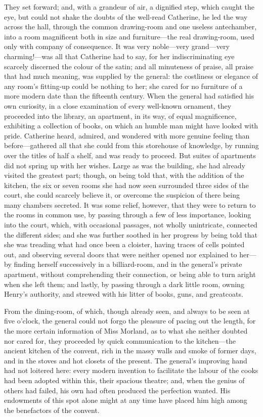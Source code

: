 They set forward; and, with a grandeur of air, a dignified step, which caught the eye, but could not shake the doubts of the well-read Catherine, he led the way across the hall, through the common drawing-room and one useless antechamber, into a room magnificent both in size and furniture---the real drawing-room, used only with company of consequence. It was very noble---very grand---very charming!---was all that Catherine had to say, for her indiscriminating eye scarcely discerned the colour of the satin; and all minuteness of praise, all praise that had much meaning, was supplied by the general: the costliness or elegance of any room's fitting-up could be nothing to her; she cared for no furniture of a more modern date than the fifteenth century. When the general had satisfied his own curiosity, in a close examination of every well-known ornament, they proceeded into the library, an apartment, in its way, of equal magnificence, exhibiting a collection of books, on which an humble man might have looked with pride. Catherine heard, admired, and wondered with more genuine feeling than before---gathered all that she could from this storehouse of knowledge, by running over the titles of half a shelf, and was ready to proceed. But suites of apartments did not spring up with her wishes. Large as was the building, she had already visited the greatest part; though, on being told that, with the addition of the kitchen, the six or seven rooms she had now seen surrounded three sides of the court, she could scarcely believe it, or overcome the suspicion of there being many chambers secreted. It was some relief, however, that they were to return to the rooms in common use, by passing through a few of less importance, looking into the court, which, with occasional passages, not wholly unintricate, connected the different sides; and she was further soothed in her progress by being told that she was treading what had once been a cloister, having traces of cells pointed out, and observing several doors that were neither opened nor explained to her---by finding herself successively in a billiard-room, and in the general's private apartment, without comprehending their connection, or being able to turn aright when she left them; and lastly, by passing through a dark little room, owning Henry's authority, and strewed with his litter of books, guns, and greatcoats.

From the dining-room, of which, though already seen, and always to be seen at five o'clock, the general could not forgo the pleasure of pacing out the length, for the more certain information of Miss Morland, as to what she neither doubted nor cared for, they proceeded by quick communication to the kitchen---the ancient kitchen of the convent, rich in the massy walls and smoke of former days, and in the stoves and hot closets of the present. The general's improving hand had not loitered here: every modern invention to facilitate the labour of the cooks had been adopted within this, their spacious theatre; and, when the genius of others had failed, his own had often produced the perfection wanted. His endowments of this spot alone might at any time have placed him high among the benefactors of the convent.

